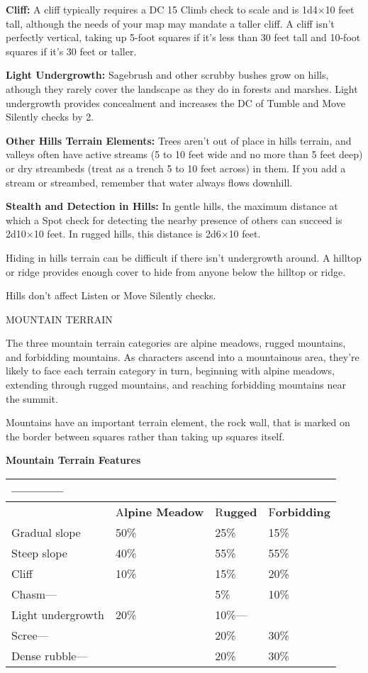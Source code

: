 \documentclass{article}
\begin{document}
\textbf{Cliff:} A cliff typically requires a DC 15 Climb check to scale and is 
1d4\ensuremath{\times}10 feet tall, although the needs of your map may mandate 
a taller cliff. A cliff isn't perfectly vertical, taking up 5-foot squares if it's 
less than 30 feet tall and 10-foot squares if it's 30 feet or taller. 

\textbf{Light Undergrowth:} Sagebrush and other scrubby bushes grow on hills, athough 
they rarely cover the landscape as they do in forests and marshes. Light undergrowth 
provides concealment and increases the DC of Tumble and Move Silently checks by 
2. 

\textbf{Other Hills Terrain Elements:} Trees aren't out of place in hills terrain, 
and valleys often have active streams (5 to 10 feet wide and no more than 5 feet 
deep) or dry streambeds (treat as a trench 5 to 10 feet across) in them. If you 
add a stream or streambed, remember that water always flows downhill.

\textbf{Stealth and Detection in Hills:} In gentle hills, the maximum distance 
at which a Spot check for detecting the nearby presence of others can succeed is 
2d10\ensuremath{\times}10 feet. In rugged hills, this distance is 2d6\ensuremath{\times}10 
feet.

Hiding in hills terrain can be difficult if there isn't undergrowth around. A hilltop 
or ridge provides enough cover to hide from anyone below the hilltop or ridge.

Hills don't affect Listen or Move Silently checks. 

\vspace{12pt}
MOUNTAIN TERRAIN

The three mountain terrain categories are alpine meadows, rugged mountains, and 
forbidding mountains. As characters ascend into a mountainous area, they're likely 
to face each terrain category in turn, beginning with alpine meadows, extending 
through rugged mountains, and reaching forbidding mountains near the summit.

Mountains have an important terrain element, the rock wall, that is marked on the 
border between squares rather than taking up squares itself. 

\textbf{Mountain Terrain Features}

\begin{tabular}{|>{\raggedright}p{74pt}|>{\raggedright}p{66pt}|>{\raggedright}p{31pt}|>{\raggedright}p{47pt}|}
\hline
 ------------ & \multicolumn{3}{p{145pt}|}{ \textbf{Mountain Category ------------}}\tabularnewline
\hline
  & A\textbf{lpine Meadow} & R\textbf{ugged} & F\textbf{orbidding}\tabularnewline
\hline
Gradual slope & 50\% & 25\% & 15\%\tabularnewline
\hline
Steep slope & 40\% & 55\% & 55\%\tabularnewline
\hline
Cliff & 10\% & 15\% & 20\%\tabularnewline
\hline
Chasm--- &  & 5\% & 10\%\tabularnewline
\hline
Light undergrowth & 20\% & 10\%--- & \tabularnewline
\hline
Scree--- &  & 20\% & 30\%\tabularnewline
\hline
Dense rubble--- &  & 20\% & 30\%\tabularnewline
\hline
\end{tabular}
\end{document}
